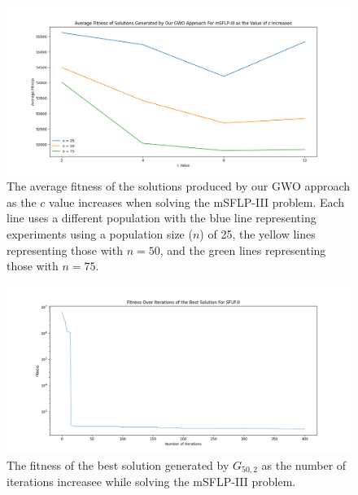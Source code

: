 \begin{figure}[h!]
\centering
\begin{adjustwidth}{-0.45in}{}
	\includegraphics[scale=0.5]{./images/chap07-rd/gwo-only-msflp3-average-fitness-as-c-value-increases.png}
\end{adjustwidth}
\caption{The average fitness of the solutions produced by our GWO approach as the $c$ value increases when solving the mSFLP-III problem. Each line uses a different population with the blue line representing experiments using a population size ($n$) of 25, the yellow lines representing those with $n = 50$, and the green lines representing those with $n = 75$.}
\label{approach-gwo-msflp-iii-average-fitness-as-c-value-increases}
\end{figure}

\begin{figure}[h!]
\centering
\begin{adjustwidth}{-0.45in}{}
	\includegraphics[scale=0.5]{./images/chap07-rd/gwo-only-sflp2-best-solution-fitness-graph.png}
\end{adjustwidth}
\caption{The fitness of the best solution generated by $G_{50,2}$ as the number of iterations increasee while solving the mSFLP-III problem.}
\label{approach-gwo-msflp-iii-best-solution-fitness-over-time}
\end{figure}

